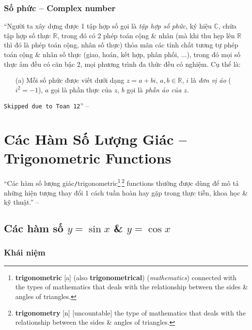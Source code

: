 \documentclass[oneside]{book}
\numberwithin{equation}{section}
\begin{document}
\subsubsection{Số phức -- Complex number}
``Người ta xây dựng được 1 tập hợp số gọi là \textit{tập hợp số phức}, ký hiệu $\mathbb{C}$, chứa tập hợp số thực $\mathbb{R}$, trong đó có 2 phép toán cộng \& nhân (mà khi thu hẹp lên $\mathbb{R}$ thì đó là phép toán cộng, nhân số thực) thỏa mãn các tính chất tương tự phép toán cộng \& nhân số thực (giao, hoán, kết hợp, phân phối, $\ldots$), trong đó mọi số thực âm đều có căn bậc 2, mọi phương trình đa thức đều có nghiệm. Cụ thể là:
\begin{itemize}
	\item[(a)] Mỗi số phức được viết dưới dạng $z = a + bi$, $a,b\in\mathbb{R}$, $i$ là \textit{đơn vị ảo} ($i^2 = -1$), $a$ gọi là phần thực của $z$, $b$ gọi là \textit{phần ảo của $z$}.
\end{itemize}
\texttt{Skipped due to Toan 12}'' -- \cite[p. 7]{TL_chuyen_Toan_Dai_So_Giai_Tich_11}


\section{Các Hàm Số Lượng Giác -- Trigonometric Functions}
``Các hàm số lượng giác\texttt{/}trigonometric\footnote{\textbf{trigonometric} [a] (also \textbf{trigonometrical}) (\textit{mathematics}) connected with the types of mathematics that deals with the relationship between the sides \& angles of triangles.}\,\footnote{\textbf{trigonometry} [n] [uncountable] the type of mathematics that deals with the relationship between the sides \& angles of triangles.} functions thường được dùng để mô tả những hiện tượng thay đổi 1 cách tuần hoàn hay gặp trong thực tiễn, khoa học \& kỹ thuật.'' -- \cite[p. 4]{SGK_Toan_11_dai_so_giai_tich_nang_cao}

\subsection{Các hàm số $y = \sin x$ \& $y = \cos x$}

\subsubsection{Khái niệm}
\end{document}
